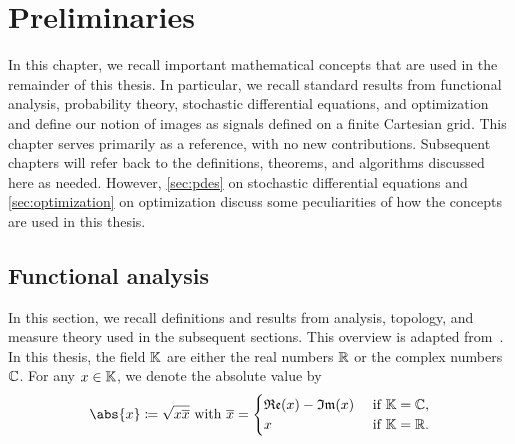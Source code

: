 \chapter{Preliminaries}%
\label{chap:preliminaries}%
\graphicspath{{./chapters/preliminaries/scripts/}}%
In this chapter, we recall important mathematical concepts that are used in the remainder of this thesis.
In particular, we recall standard results from functional analysis, probability theory, stochastic differential equations, and optimization and define our notion of images as signals defined on a finite Cartesian grid.
This chapter serves primarily as a reference, with no new contributions.
Subsequent chapters will refer back to the definitions, theorems, and algorithms discussed here as needed.
However, \cref{sec:pdes} on stochastic differential equations and \cref{sec:optimization} on optimization discuss some peculiarities of how the concepts are used in this thesis.
\section{Functional analysis}
In this section, we recall definitions and results from analysis, topology, and measure theory used in the subsequent sections.
This overview is adapted from~\cite{Alt2016,beck_firstorder_2017,Klenke2014}.
In this thesis, the field \( \mathbb{K} \) are either the real numbers \( \mathbb{R} \) or the complex numbers \( \mathbb{C} \).
For any \( x \in \mathbb{K} \), we denote the absolute value by
\begin{equation}
	\abs{x} \coloneqq \sqrt{x\conj{x}}\ \text{with}\ \conj{x} = \begin{cases}
		\mathfrak{Re}(x) - \mathfrak{Im}(x) &\ \text{if}\ \Field = \C, \\
		x &\ \text{if}\ \Field = \R.
	\end{cases}
\end{equation}
